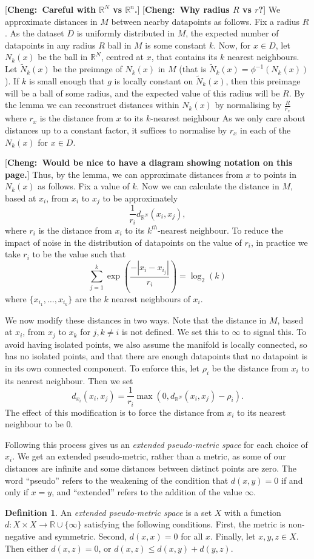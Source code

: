 \documentclass[a4paper,11pt,leqno]{article} \usepackage{amsmath}
\newcommand{\RR}{\mathbb{R}} \newcommand{\QQ}{\mathbb{Q}}
\theoremstyle{definition}
\newtheorem{defn}{Definition}
\newcommand{\cheng}[1]{ {\color{purple}[{\bf Cheng:~{#1}}]} }
\begin{document}
\cheng{Careful with $\RR^N$ vs $\RR^n$.}
\cheng{Why radius $R$ vs $r$?}
We approximate distances in $M$ between nearby datapoints as follows.
Fix a radius $R$.
As the dataset $D$ is uniformly distributed in $M$, the expected number of
datapoints in any radius $R$ ball in $M$ is some constant $k$.
Now, for $x\in D$, let $N_k(x)$ be the ball in $\RR^N$, centred at $x$, that
contains its $k$ nearest neighbours.
Let $\tilde{N}_k(x)$ be the preimage of $N_k(x)$ in $M$
(that is $\tilde{N}_k(x) = \phi^{-1}(N_k(x))$).
If $k$ is small enough that $g$ is locally constant on $\tilde{N}_k(x)$, then
this preimage will be a ball of some radius, and the expected value of this
radius will be $R$.
By the lemma we can reconstruct
distances within $N_k(x)$ by normalising by $\frac{R}{r_x}$ where $r_x$ is the
distance from $x$ to its $k$-nearest neighbour
As we only care about distances up to a constant factor, it suffices to
normalise by $r_x$ in each of the $N_k(x)$ for $x\in D$.

\cheng{Would be nice to have a diagram showing notation on this page.}
Thus, by the lemma, we can approximate distances from $x$ to points in $N_k(x)$
as follows.
Fix a value of $k$.
Now we can calculate the distance in $M$, based at $x_i$, from $x_i$ to $x_j$
to be approximately
$$\frac{1}{r_i}d_{\RR^N}(x_i, x_j),$$
where $r_i$ is the distance from $x_i$ to its $k^{th}$-nearest neighbour.
To reduce the impact of noise in the distribution of datapoints on the value of
$r_i$, in practice we take $r_i$ to be the value such that
$$\sum_{j=1}^k\exp\left(\frac{-|x_i-x_{i_j}|}{r_i}\right) = \log_2(k)$$
where $\{x_{i_1},\ldots,x_{i_k}\}$ are the $k$ nearest neighbours of $x_i$.

We now modify these distances in two ways.
Note that the distance in $M$, based at $x_i$, from $x_j$ to $x_k$ for
$j,k\not= i$ is not defined.
We set this to $\infty$ to signal this.
To avoid having isolated points, we also assume the manifold is locally
connected, so has no isolated points, and that there are enough datapoints that
no datapoint is in its own connected component.
To enforce this, let $\rho_i$ be the distance from $x_i$ to its nearest
neighbour.
Then we set
$$d_{x_i}(x_i, x_j)=\frac{1}{r_i}\max(0, d_{\RR^N}(x_i,
x_j)-\rho_i).$$
The effect of this modification is to force the distance from $x_i$ to its
nearest neighbour to be 0.

Following this process gives us an \emph{extended pseudo-metric space} for each
choice of $x_i$.
We get an extended pseudo-metric, rather than a metric, as some of our
distances are infinite and some distances between distinct points are zero.
The word ``pseudo'' refers to the weakening of the condition that $d(x,y) = 0$
if and only if $x = y$, and ``extended'' refers to the addition of the value
$\infty$.
\begin{defn}
  \label{definition_ex_pmetric_space}
  An \emph{extended pseudo-metric space} is a set $X$ with a function $d:
  X\times X\to \RR \cup \{\infty\}$ satisfying the following conditions.
  First, the metric is non-negative and symmetric.
  Second, $d(x, x) = 0$ for all $x$.
  Finally, let $x,y,z\in X$.
  Then either $d(x,z) = 0$, or $d(x,z)\leq d(x,y)+d(y,z)$.
\end{defn}
\end{document}
